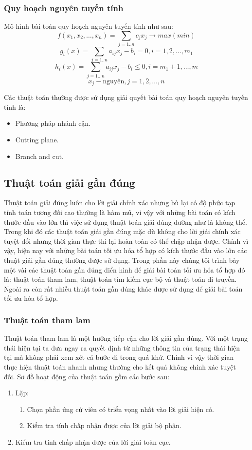 \documentclass[a4paper,12pt]{report}
\begin{document}
\subsubsection{Quy hoạch nguyên tuyến tính}
Mô hình bài toán quy hoạch nguyên tuyến tính\cite{TUHTH} như sau: 
$$f(x_1,x_2,\ldots, x_n)=\sum_{j=1..n}c_jx_j \rightarrow max(min)$$
$$g_i(x)=\sum_{j=1..n}a_{ij}x_j-b_i=0, i=1,2,\ldots, m_1$$
$$h_i(x)=\sum_{j=1\ldots n} a_{ij}x_j-b_i \leq 0, i=m_1+1, \ldots, m$$
$$x_j -\text{nguyên}, j=1,2,\ldots,n$$

Các thuật toán thường được sử dụng giải quyết bài toán quy hoạch nguyên tuyến tính là: 
\begin{itemize}
\item Phương pháp nhánh cận.
\item Cutting plane.
\item Branch and cut.
\end{itemize}
\subsection{Thuật toán giải gần đúng}
Thuật toán giải đúng luôn cho lời giải chính xác nhưng bù lại có độ phức tạp tính toán tương đối cao thường là hàm mũ, vi vậy với những bài toán có kích thước đầu vào lớn thì việc sử dụng thuật toán giải đúng dường như là không thể. Trong khi đó các thuật toán giải gần đúng mặc dù không cho lời giải chính xác tuyệt đối nhưng thời gian thực thi lại hoàn toàn có thể chập nhận được. Chính vì vậy, hiện nay với những bài toán tối ưu hóa tổ hợp có kích thước đầu vào lớn các thuật giải gần đúng thường được sử dụng. Trong phần này chúng tôi trình bày một vài các thuật toán gần đúng điển hình để giải bài toán tối ưu hóa tổ hợp đó là: thuật toán tham lam, thuật toán tìm kiếm cục bộ và thuật toán di truyền. Ngoài ra còn rất nhiều thuật toán gần đúng khác được sử dụng để giải bài toán tối ưu hóa tổ hợp.
\subsubsection{Thuật toán tham lam}
Thuật toán tham lam là một hướng tiếp cận cho lời giải gần đúng. Với một trạng thái hiện tại ta đưa ngay ra quyết định từ những thông tin của trạng thái hiện tại mà không phải xem xét cá bước đi trong quá khứ. Chính vì vậy thời gian thực hiện thuật toán nhanh nhưng thường cho kết quả không chính xác tuyệt đối. Sơ đồ hoạt động của thuật toán gồm các bước sau:
\begin{enumerate}
\item Lặp:
\begin{enumerate}

\item Chọn phần ứng cử viên có triển vọng nhất vào lời giải hiện có.
\item Kiểm tra tính chấp nhận được của lời giải bộ phận.

\end{enumerate}
\item Kiểm tra tính chấp nhận được của lời giải toàn cục. \cite{DAA}
\end{enumerate}
\end{document}
